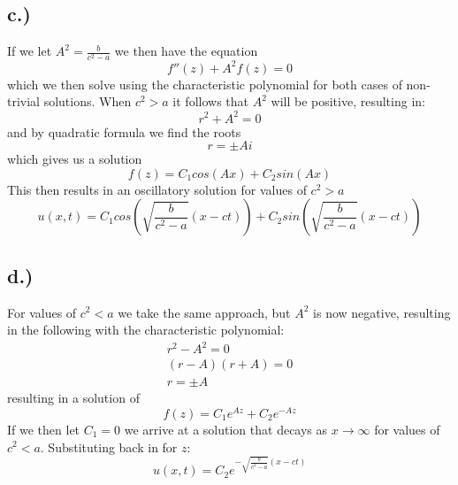 \documentclass{article}
\begin{document}
\subsection*{c.)}
If we let $A^2 = \frac{b}{c^2 -a}$ we then have the equation
\begin{equation}
f''(z) + A^2f(z) = 0
\end{equation}
which we then solve using the characteristic polynomial for both cases of non-trivial solutions. When $c^2 > a$ it follows that $A^2$ will be positive, resulting in:
\begin{equation}
r^2 + A^2 = 0
\end{equation}
and by quadratic formula we find the roots
\begin{equation}
r = \pm Ai
\end{equation}
which gives us a solution 
\begin{equation}
f(z) = C_1cos(Ax) + C_2sin(Ax)
\end{equation}
This then results in an oscillatory solution for values of $c^2 > a$
\begin{equation}
u(x, t) = C_1cos(\sqrt{\frac{b}{c^2 - a}}(x - ct)) + C_2sin(\sqrt{\frac{b}{c^2 - a}}(x - ct))
\end{equation}
\subsection*{d.)}
For values of $c^2<a$ we take the same approach, but $A^2$ is now negative, resulting in the following with the characteristic polynomial:
\begin{equation}
\begin{aligned}
r^2 - A^2 = 0\\
(r - A)(r + A) = 0\\
r = \pm A
\end{aligned}
\end{equation}
resulting in a solution of
\begin{equation}
f(z) = C_1e^{Az} + C_2e^{-Az}
\end{equation}
If we then let $C_1 = 0$ we arrive at a solution that decays as $x \to \infty$ for values of $c^2 < a$. Substituting back in for $z$:
\begin{equation}
u(x,t) = C_2e^{-\sqrt{\frac{b}{c^2 - a}}(x-ct)}
\end{equation}
\end{document}
